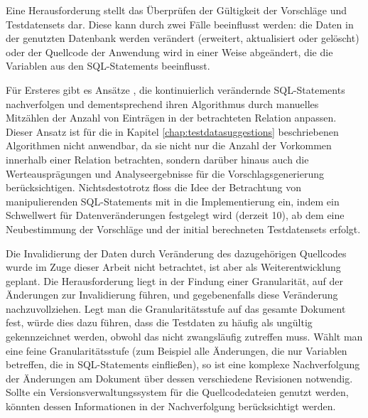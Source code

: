 Eine Herausforderung stellt das Überprüfen der Gültigkeit der Vorschläge und Testdatensets dar.
Diese kann durch zwei Fälle beeinflusst werden: die Daten in der genutzten Datenbank werden verändert (erweitert, aktualisiert oder gelöscht) oder der Quellcode der Anwendung wird in einer Weise abgeändert, die die Variablen aus den SQL-Statements beeinflusst.

Für Ersteres gibt es Ansätze \cite{DBLP:conf/dasfaa/HarangsriSN97}, die kontinuierlich verändernde SQL-Statements nachverfolgen und dementsprechend ihren Algorithmus durch manuelles Mitzählen der Anzahl von Einträgen in der betrachteten Relation anpassen.
Dieser Ansatz ist für die in Kapitel \ref{chap:testdatasuggestions} beschriebenen Algorithmen nicht anwendbar, da sie nicht nur die Anzahl der Vorkommen innerhalb einer Relation betrachten, sondern darüber hinaus auch die Werteausprägungen und Analyseergebnisse für die Vorschlagsgenerierung berücksichtigen.
Nichtsdestotrotz floss die Idee der Betrachtung von manipulierenden SQL-Statements mit in die Implementierung ein, indem ein Schwellwert für Datenveränderungen festgelegt wird (derzeit 10), ab dem eine Neubestimmung der Vorschläge und der initial berechneten Testdatensets erfolgt.

Die Invalidierung der Daten durch Veränderung des dazugehörigen Quellcodes wurde im Zuge dieser Arbeit nicht betrachtet, ist aber als Weiterentwicklung geplant.
Die Herausforderung liegt in der Findung einer Granularität, auf der Änderungen zur Invalidierung führen, und gegebenenfalls diese Veränderung nachzuvollziehen.
Legt man die Granularitätsstufe auf das gesamte Dokument fest, würde dies dazu führen, dass die Testdaten zu häufig als ungültig gekennzeichnet werden, obwohl das nicht zwangsläufig zutreffen muss.
Wählt man eine feine Granularitätsstufe (zum Beispiel alle Änderungen, die nur Variablen betreffen, die in SQL-Statements einfließen), so ist eine komplexe Nachverfolgung der Änderungen am Dokument über dessen verschiedene Revisionen notwendig.
Sollte ein Versionsverwaltungssystem für die Quellcodedateien genutzt werden, könnten dessen Informationen in der Nachverfolgung berücksichtigt werden.

